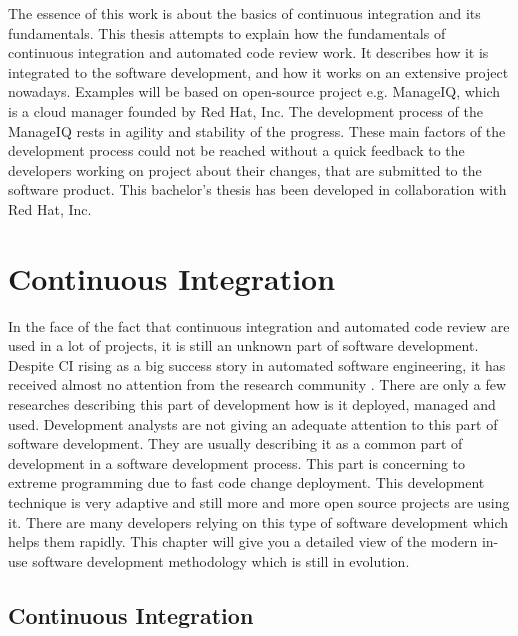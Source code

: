 The essence of this work is about the basics of continuous integration and its fundamentals. This thesis attempts to explain how the fundamentals of continuous integration and automated code review work. It describes how it is integrated to the software development, and how it works on an extensive project nowadays. Examples will be based on open-source project e.g. ManageIQ, which is a cloud manager founded by Red Hat, Inc. The development process of the ManageIQ rests in agility and stability of the progress. These main factors of the development process could not be reached without a quick feedback to the developers working on project about their changes, that are submitted to the software product. This bachelor's thesis has been developed in collaboration with Red Hat, Inc.

\chapter{Continuous Integration}

In the face of the fact that continuous integration and automated code review are used in a lot of projects, it is still an unknown part of software development. Despite CI rising as a big success story in automated software engineering, it has received almost no attention from the research community \cite{COPE}. There are only a few researches describing this part of development how is it deployed, managed and used. Development analysts are not giving an adequate attention to this part of software development. They are usually describing it as a common part of development in a software development process. This part is concerning to extreme programming due to fast code change deployment. This development technique is very adaptive and still more and more open source projects are using it. There are many developers relying on this type of software development which helps them rapidly. This chapter will give you a detailed view of the modern in-use software development methodology which is still in evolution.

\section{Continuous Integration}

